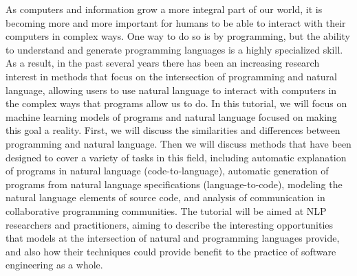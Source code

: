 As computers and information grow a more integral part of our world, it is becoming more and more important for humans to be able to interact with their computers in complex ways. One way to do so is by programming, but the ability to understand and generate programming languages is a highly specialized skill. As a result, in the past several years there has been an increasing research interest in methods that focus on the intersection of programming and natural language, allowing users to use natural language to interact with computers in the complex ways that programs allow us to do. In this tutorial, we will focus on machine learning models of programs and natural language focused on making this goal a reality. First, we will discuss the similarities and differences between programming and natural language. Then we will discuss methods that have been designed to cover a variety of tasks in this field, including automatic explanation of programs in natural language (code-to-language), automatic generation of programs from natural language specifications (language-to-code), modeling the natural language elements of source code, and analysis of communication in collaborative programming communities. The tutorial will be aimed at NLP researchers and practitioners, aiming to describe the interesting opportunities that models at the intersection of natural and programming languages provide, and also how their techniques could provide benefit to the practice of software engineering as a whole.
